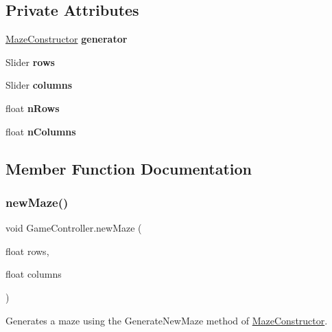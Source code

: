 \subsection*{Private Attributes}
\begin{DoxyCompactItemize}
\item 
\mbox{\label{class_game_controller_a139bb6e2dd71b89921a8d7bd579cf69d}} 
\mbox{\hyperlink{class_maze_constructor}{Maze\+Constructor}} {\bfseries generator}
\item 
\mbox{\label{class_game_controller_a0d78427613acdfd053f2e5e30b0454c7}} 
Slider {\bfseries rows}
\item 
\mbox{\label{class_game_controller_a8843c4bd689cc8e5e9a7a90c8ac4cd8c}} 
Slider {\bfseries columns}
\item 
\mbox{\label{class_game_controller_ab4dccdf556bb39d2b58e6619b3346bfc}} 
float {\bfseries n\+Rows}
\item 
\mbox{\label{class_game_controller_a3adf52c742d461164ed5684f9cfa3dd0}} 
float {\bfseries n\+Columns}
\end{DoxyCompactItemize}


\subsection{Member Function Documentation}
\mbox{\label{class_game_controller_a1a65ce7d8077d3ee9fb43b59791181c2}} 
\subsubsection{\texorpdfstring{newMaze()}{newMaze()}}
{\footnotesize\ttfamily void Game\+Controller.\+new\+Maze (\begin{DoxyParamCaption}\item[{float}]{rows,  }\item[{float}]{columns }\end{DoxyParamCaption})}



Generates a maze using the Generate\+New\+Maze method of \mbox{\hyperlink{class_maze_constructor}{Maze\+Constructor}}. 

